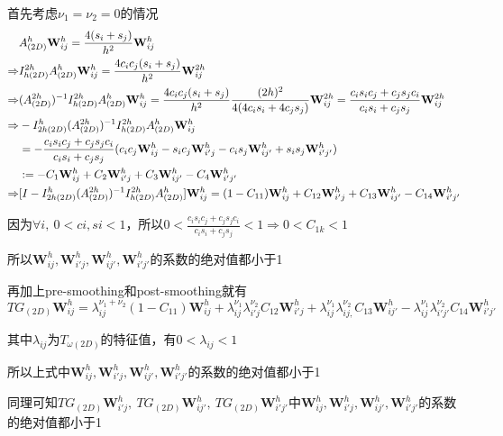 \documentclass{article}
\begin{document}
首先考虑$\nu_1=\nu_2=0$的情况
\begin{align}
                & A_{(2D)}^h\mathbf{W}_{ij}^h = \frac{4(s_i+s_j)}{h^2}\mathbf{W}_{ij}^h \notag \\
    \Rightarrow & I_{h(2D)}^{2h}A_{(2D)}^h\mathbf{W}_{ij}^h=\frac{4c_ic_j(s_i+s_j)}{h^2}\mathbf{W}_{ij}^{2h} \notag \\
    \Rightarrow & (A_{(2D)}^{2h})^{-1}I_{h(2D)}^{2h}A_{(2D)}^h\mathbf{W}_{ij}^h = \frac{4c_ic_j(s_i+s_j)}{h^2} \frac{(2h)^2}{4(4c_is_i+4c_js_j)}\mathbf{W}_{ij}^{2h} = \frac{c_is_ic_j+c_js_jc_i}{c_is_i+c_js_j}\mathbf{W}_{ij}^{2h} \notag \\
    \Rightarrow & -I_{2h(2D)}^h(A_{(2D)}^{2h})^{-1}I_{h(2D)}^{2h}A_{(2D)}^h\mathbf{W}_{ij}^h \notag \\
    & = -\frac{c_is_ic_j+c_js_jc_i}{c_is_i+c_js_j}(c_ic_j\mathbf{W}_{ij}^h-s_ic_j\mathbf{W}_{i'j}^h-c_is_j\mathbf{W}_{ij'}^h+s_is_j\mathbf{W}_{i'j'}^h) \notag \\
    & := -C_1\mathbf{W}_{ij}^h+C_2\mathbf{W}_{i'j}^h + C_3\mathbf{W}_{ij'}^h - C_4\mathbf{W}_{i'j'}^h \notag \\
    \Rightarrow & [I-I_{2h(2D)}^h(A_{(2D)}^{2h})^{-1}I_{h(2D)}^{2h}A_{(2D)}^h]\mathbf{W}_{ij}^h = (1-C_{11})\mathbf{W}_{ij}^h+C_{12}\mathbf{W}_{i'j}^h + C_{13}\mathbf{W}_{ij'}^h - C_{14}\mathbf{W}_{i'j'}^h\notag
\end{align}

因为$\forall i,\ 0 < ci,si < 1$，所以$0 < \frac{c_is_ic_j+c_js_jc_i}{c_is_i+c_js_j} < 1 \Rightarrow 0 < C_{1k} < 1$

所以$\mathbf{W}_{ij}^h,\mathbf{W}_{i'j}^h,\mathbf{W}_{ij'}^h,\mathbf{W}_{i'j'}^h$的系数的绝对值都小于1

再加上pre-smoothing和post-smoothing就有
$$TG_{(2D)}\mathbf{W}_{ij}^h=\lambda_{ij}^{\nu_1+\nu_2}(1-C_{11})\mathbf{W}_{ij}^h+\lambda_{ij}^{\nu_1}\lambda_{i'j}^{\nu_2}C_{12}\mathbf{W}_{i'j}^h + \lambda_{ij}^{\nu_1}\lambda_{ij,}^{\nu_2}C_{13}\mathbf{W}_{ij'}^h - \lambda_{ij}^{\nu_1}\lambda_{i'j'}^{\nu_2}C_{14}\mathbf{W}_{i'j'}^h$$

其中$\lambda_{ij}$为$T_{\omega(2D)}$的特征值，有$0 < \lambda_{ij} < 1$

所以上式中$\mathbf{W}_{ij}^h,\mathbf{W}_{i'j}^h,\mathbf{W}_{ij'}^h,\mathbf{W}_{i'j'}^h$的系数的绝对值都小于1

同理可知$TG_{(2D)}\mathbf{W}_{i'j}^h,\ TG_{(2D)}\mathbf{W}_{ij'}^h,\ TG_{(2D)}\mathbf{W}_{i'j'}^h$中$\mathbf{W}_{ij}^h,\mathbf{W}_{i'j}^h,\mathbf{W}_{ij'}^h,\mathbf{W}_{i'j'}^h$的系数的绝对值都小于1
\end{document}
